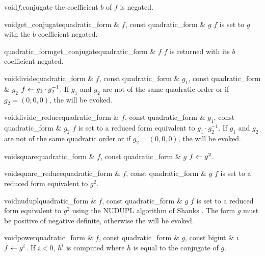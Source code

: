 \begin{fcode}{void}{$f$.conjugate}{}
  the coefficient $b$ of $f$ is negated.
\end{fcode}

\begin{fcode}{void}{get_conjugate}{quadratic_form & $f$, const quadratic_form & $g$}
  $f$ is set to $g$ with the $b$ coefficient negated.
\end{fcode}

\begin{fcode}{quadratic_form}{get_conjugate}{quadratic_form & $f$}
  $f$ is returned with its $b$ coefficient negated.
\end{fcode}

\begin{fcode}{void}{divide}{quadratic_form & $f$, const quadratic_form & $g_1$,
    const quadratic_form & $g_2$}%
  $f \leftarrow g_1 \cdot g_2^{-1}$.  If $g_1$ and $g_2$ are not of the same quadratic order or if
  $g_2 = (0,0,0)$, the \LEH will be evoked.
\end{fcode}

\begin{fcode}{void}{divide_reduce}{quadratic_form & $f$, const quadratic_form & $g_1$,
    const quadratic_form & $g_2$}%
  $f$ is set to a reduced form equivalent to $g_1 \cdot g_2^{-1}$.  If $g_1$ and $g_2$ are not
  of the same quadratic order or if $g_2 = (0,0,0)$, the \LEH will be evoked.
\end{fcode}

\begin{fcode}{void}{square}{quadratic_form & $f$, const quadratic_form & $g$}
  $f \leftarrow g^2$.
\end{fcode}

\begin{fcode}{void}{square_reduce}{quadratic_form & $f$, const quadratic_form & $g$}
  $f$ is set to a reduced form equivalent to $g^2$.
\end{fcode}

\begin{fcode}{void}{nudupl}{quadratic_form & $f$, const quadratic_form & $g$}
  $f$ is set to a reduced form equivalent to $g^2$ using the NUDUPL algorithm of Shanks
  \cite{Cohen:1995}.  The form $g$ must be positive of negative definite, otherwise the \LEH
  will be evoked.
\end{fcode}

\begin{fcode}{void}{power}{quadratic_form & $f$, const quadratic_form & $g$, const bigint & $i$}
  $f \leftarrow g^i$.  If $i < 0$, $h^i$ is computed where $h$ is equal to the conjugate of $g$.
\end{fcode}

